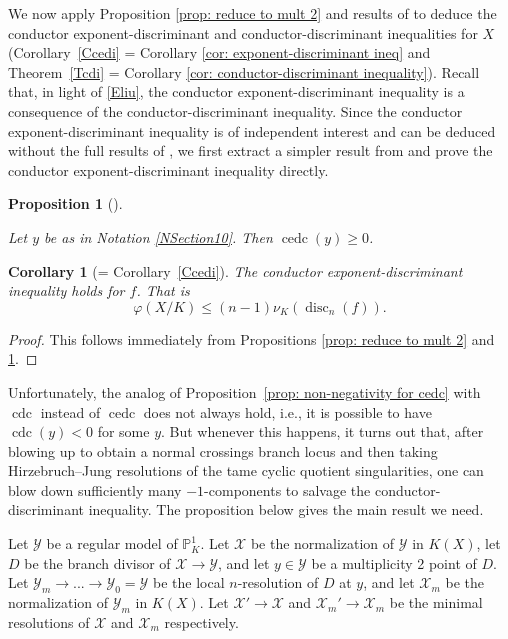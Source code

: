 \documentclass[12pt]{amsart}
\numberwithin{equation}{section}
\newtheorem{corollary}[equation]{Corollary}
\newtheorem{prop}[equation]{Proposition}
\theoremstyle{definition}
\newcommand{\padma}[1]{{\color{Magenta} \sf $\clubsuit\clubsuit\clubsuit$ Padma: [#1]}}
\newcommand{\andrew}[1]{{\color{Green} \sf $\diamondsuit\diamondsuit\diamondsuit$ Andrew: [#1]}}
\renewcommand{\O}{\mathcal{O}}
\renewcommand{\P}{\mathbb P}
\newcommand{\proj}{\mathbb P}
\renewcommand{\phi}{\varphi}
\newcommand{\X}{\mathcal{X}}
\newcommand{\Y}{\mathcal{Y}}
\DeclareMathOperator{\disc}{disc}
\DeclareMathOperator{\cdc}{cdc}
\DeclareMathOperator{\cedc}{cedc}
\begin{document}
We now apply Proposition \ref{prop: reduce to mult 2} and results of
\cite{Part2} to deduce the conductor exponent-discriminant
and
conductor-discriminant inequalities for $X$ (Corollary~\ref{Ccedi} = Corollary \ref{cor:
  exponent-discriminant ineq} and Theorem~\ref{Tcdi} = Corollary \ref{cor:
  conductor-discriminant inequality}). Recall that, in light of \eqref{Eliu}, the conductor exponent-discriminant inequality
is a consequence of the conductor-discriminant inequality. Since the
conductor exponent-discriminant inequality is of independent interest
and can be deduced without the full results of \cite{Part2}, we
first extract a simpler result from \cite{Part2} and prove
the conductor exponent-discriminant inequality directly.

\begin{prop}[{\cite[Theorem 1.6]{Part2}}]\label{prop: non-negativity for cedc}

Let $y$ be as in Notation \ref{NSection10}. Then $\cedc(y)\geq0$.
\end{prop}

\begin{corollary}[= Corollary~\ref{Ccedi}]\label{cor: exponent-discriminant ineq}
The conductor exponent-discriminant inequality holds for
$f$. That is
    \[\phi(X/K)\leq (n-1)\nu_K(\disc_n(f)).\]
\end{corollary}
\begin{proof}
    This follows immediately from Propositions \ref{prop: reduce to mult 2} and \ref{prop: non-negativity for cedc}.
\end{proof}

Unfortunately, the analog of Proposition~\ref{prop: non-negativity for
  cedc} with $\cdc$ instead of $\cedc$ does not always hold, i.e., it is possible to have $\cdc(y) < 0$ for some $y$.
But whenever this happens, it turns out that, after blowing up to
obtain a normal crossings branch locus and then taking
Hirzebruch--Jung resolutions of the tame cyclic quotient singularities, one
can blow down sufficiently many $-1$-components to salvage the
conductor-discriminant inequality.  The proposition below gives the
main result we need.

Let $\Y$ be a regular model of $\proj^1_K$.
Let $\X$ be the normalization of $\Y$ in $K(X)$, let $D$ be the
branch divisor of $\X \rightarrow \Y$, and let $y \in \Y$ be a
multiplicity 2 point of $D$. Let $\Y_m\to...\to\Y_0 = \Y$ be the local
$n$-resolution of $D$ at $y$, and  let $\X_m$ be the normalization of
$\Y_m$ in $K(X)$. Let $\X'\to\X$ and $\X_m'\to\X_m$ be the minimal resolutions of $\X$ and $\X_m$ respectively.
\end{document}

